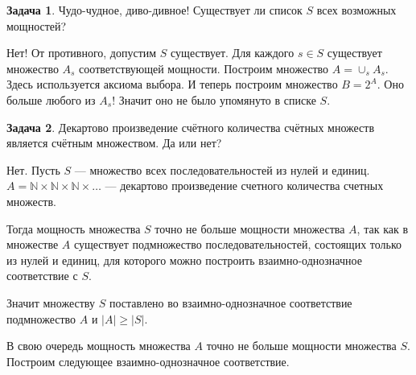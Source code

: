\documentclass[pdftex, 12pt, a4paper]{article}
\def \mbb{\mathbb}
\def \NN{\mbb N}
\renewcommand{\ge}{\geqslant}
\theoremstyle{definition} %
\newtheorem{problem}{Задача}
\numberwithin{problem}{section}
\numberwithin{blits}{section}
\begin{document}
\begin{problem}
Чудо-чудное, диво-дивное! Существует ли список $S$ всех возможных мощностей?
\begin{sol}
Нет! От противного, допустим $S$ существует. Для каждого $s\in S$ существует множество $A_{s}$ соответствующей мощности. Построим множество $A=\cup_{s}A_{s}$. Здесь используется аксиома выбора. И теперь построим множество $B=2^{A}$. Оно больше любого из $A_{s}$! Значит оно не было упомянуто в списке $S$.
\end{sol}
\end{problem}

\begin{problem}
Декартово произведение счётного количества счётных множеств
является счётным множеством. Да или нет?
\begin{sol}
Нет. Пусть $S$ --- множество всех последовательностей из нулей и единиц. $A = \NN \times \NN \times \NN \times \ldots$ --- декартово произведение счетного количества счетных множеств.

Тогда мощность множества $S$ точно не больше мощности множества $A$, так как в множестве $A$ существует подмножество последовательностей, состоящих только из нулей и единиц, для которого можно построить взаимно-однозначное соответствие с $S$.

Значит множеству $S$ поставлено во взаимно-однозначное соответствие подмножество $A$ и $|A| \ge |S|$.

В свою очередь мощность множества $A$ точно не больше мощности множества $S$. Построим следующее взаимно-однозначное соответствие.


\end{sol}
\end{problem}
\end{document}
